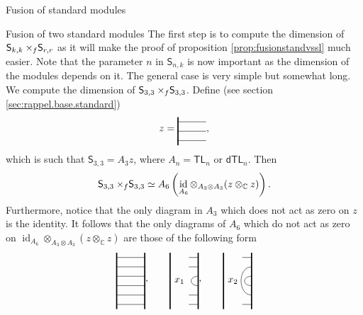 \documentclass[reqno]{amsart}
\newcommand{\dtl}[1]{\mathsf{dTL}_{#1}}
\newcommand{\tl}[1]{\mathsf{TL}_{#1}}
\newcommand{\ds}[1]{\mathsf S_{#1}}
\newcommand{\xf}{\times\hspace{-0.27em}_f}
\DeclareMathOperator{\id}{id}
\begin{document}
\begin{section}{Fusion of standard modules}
\begin{subsection}{Fusion of two standard modules}
The first step is to compute the dimension of $ \ds{k, k} \xf \ds{r,r}$ as it will make the proof of proposition \ref{prop:fusionstandvssl} much easier. Note that the parameter $n$ in $\ds{n,k}$ is now important as the dimension of the modules depends on it. The general case is very simple but somewhat long. %
 We compute the dimension of $ \ds{3,3} \xf \ds{3,3}$. Define (see section \ref{sec:rappel.base.standard})
$$z = \begin{tikzpicture}[baseline={(current bounding box.center)},scale = 1/3]
%
	\draw[very thick] (0,-3/2) -- (0,3/2);
	\draw (0,-1) -- (3,-1);
	\draw (0,0) -- (3,0);
	\draw (0,1) -- (3,1);
%
\end{tikzpicture}, $$
which is such that $\ds{3,3} = A_{3}z$, where $A_n = \tl{n}$ or $\dtl{n}$. Then $$\ds{3,3} \xf \ds{3,3} \simeq A_{6} \left(\id_{A_6} \otimes_{A_{3} \otimes A_{3}} ( z \otimes_{\mathbb{C}} z)\right) .$$ Furthermore, notice that the only diagram in $A_{3}$ which does not act as zero on $z$ is the identity. It follows that the only diagrams of $A_{6}$ which do not act as zero on $\id_{A_6} \otimes_{A_{3} \otimes A_{3}} ( z \otimes_{\mathbb{C}} z)$ are those of the following form
\begin{equation}
\begin{tikzpicture}[baseline={(current bounding box.center)},scale = 1/3]
%
	\draw[very thick] (0,-3) -- (0,3);
	\draw[very thick] (3,-3) -- (3,3);
	\draw (3,-5/2) -- (0,-5/2);
	\draw (3,-3/2) -- (0,-3/2);
	\draw (3,-1/2) -- (0,-1/2);
	\draw (3,1/2) -- (0,1/2);
	\draw (3,3/2) -- (0,3/2);
	\draw (3,5/2) -- (0,5/2);
%
\end{tikzpicture},\qquad
\begin{tikzpicture}[baseline={(current bounding box.center)},scale = 1/3]
%
	\draw[very thick] (0,-3) -- (0,3);
	\draw[very thick] (3,-3) -- (3,3);
	\draw (3,-5/2) -- (2,-5/2);
	\draw (3,-3/2) -- (2,-3/2);
	\draw (3,-1/2) .. controls (2,-1/2) and (2,1/2) .. (3,1/2);
	\draw (3,3/2) -- (2,3/2);
	\draw (3,5/2) -- (2,5/2);
%
	\node at (1,0) {$x_1$};
\end{tikzpicture}, \qquad
\begin{tikzpicture}[baseline={(current bounding box.center)},scale = 1/3]
%
	\draw[very thick] (0,-3) -- (0,3);
	\draw[very thick] (3,-3) -- (3,3);
	\draw (3,-5/2) -- (2,-5/2);
	\draw (3,-3/2) .. controls (3/2,-3/2) and (3/2,3/2) ..  (3,3/2);
	\draw (3,-1/2) .. controls (2,-1/2) and (2,1/2) .. (3,1/2);
	\draw (3,5/2) -- (2,5/2);
%
	\node at (1,0) {$x_2$};

\end{tikzpicture}
\end{equation}
\end{subsection}
\end{section}
\end{document}
